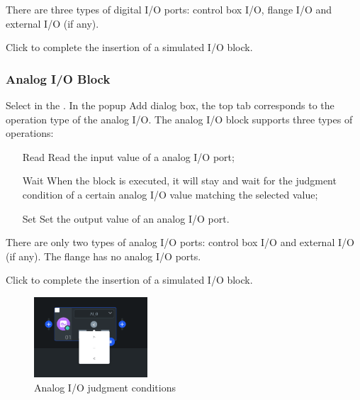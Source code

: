 There are three types of digital I/O ports: control box I/O, flange I/O and external I/O (if any).


Click  to complete the insertion of a simulated I/O block.





\subsubsection{Analog I/O Block}
Select  in the . In the pop­up Add dialog box, the top tab corresponds to the operation type of the analog I/O. The analog I/O block supports three types of operations:
\begin{itemize}[leftmargin=4.5em]
\item[Read] Read the input value of a analog I/O port;
\item[Wait] When the block is executed, it will stay and wait for the judgment condition of a certain analog I/O value matching the selected value;
\item[Set] Set the output value of an analog I/O port.
\end{itemize}

There are only two types of analog I/O ports: control box I/O and external I/O (if any). The flange has no analog I/O ports.

Click to  complete the insertion of a simulated I/O block.





\begin{figure}[ht]
	\centering
	\includegraphics[height=3cm]{en/image/3-13.png}
	\caption{Analog I/O judgment conditions}
	\label{fig:模拟IO判断条件}
\end{figure}

